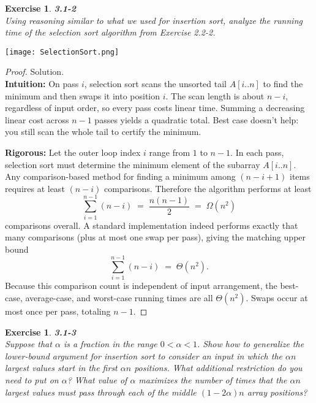 \documentclass[12pt]{article}
\newtheorem{exercise}[theorem]{Exercise}
\theoremstyle{definition}
\begin{document}
\newpage

\begin{exercise}
\noindent
\textbf{3.1-2} \\
Using reasoning similar to what we used for insertion sort, analyze the running time
of the selection sort algorithm from Exercise 2.2-2.
\end{exercise}

\begin{center}
\texttt{[image: SelectionSort.png]}
\end{center}

\begin{proof}
Solution. \\

\noindent
\textbf{Intuition:}  
On pass $i$, selection sort scans the unsorted tail $A[i..n]$ to find the minimum
and then swaps it into position $i$. The scan length is about $n-i$, regardless of
input order, so every pass costs linear time. Summing a decreasing linear cost across
$n-1$ passes yields a quadratic total. Best case doesn’t help: you still scan the whole
tail to certify the minimum.

\noindent
\textbf{Rigorous:}  
Let the outer loop index $i$ range from $1$ to $n-1$. In each pass, selection sort
must determine the minimum element of the subarray $A[i..n]$. Any comparison-based
method for finding a minimum among $(n-i+1)$ items requires at least $(n-i)$
comparisons. Therefore the algorithm performs at least
\[
\sum_{i=1}^{n-1} (n-i) \;=\; \frac{n(n-1)}{2} \;=\; \Omega(n^2)
\]
comparisons overall. A standard implementation indeed performs exactly that many
comparisons (plus at most one swap per pass), giving the matching upper bound
\[
\sum_{i=1}^{n-1} (n-i) \;=\; \Theta(n^2).
\]
Because this comparison count is independent of input arrangement, the best-case,
average-case, and worst-case running times are all $\Theta(n^2)$. Swaps occur at most
once per pass, totaling $n-1$.
\end{proof}

\newpage

\begin{exercise}
\noindent
\textbf{3.1-3} \\
Suppose that $\alpha$ is a fraction in the range $0<\alpha<1$. Show how to generalize
the lower-bound argument for insertion sort to consider an input in which the $\alpha n$
largest values start in the first $\alpha n$ positions. What additional restriction do
you need to put on $\alpha$? What value of $\alpha$ maximizes the number of times
that the $\alpha n$ largest values must pass through each of the middle $(1-2\alpha)n$
array positions?
\end{exercise}
\end{document}

